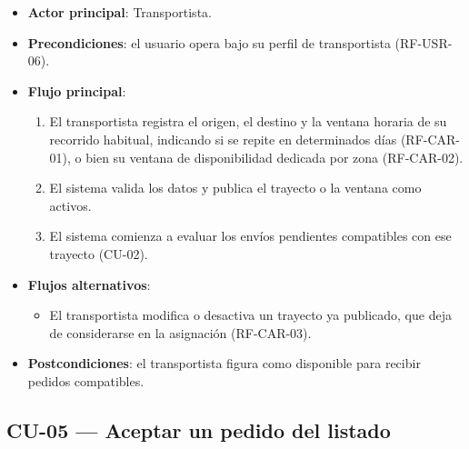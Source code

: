 {\begin{itemize}[leftmargin=2em]
    \item \textbf{Actor principal}: Transportista.
    \item \textbf{Precondiciones}: el usuario opera bajo su perfil de transportista (RF-USR-06).
    \item \textbf{Flujo principal}:
    \begin{enumerate}[leftmargin=2em]
        \item El transportista registra el origen, el destino y la ventana horaria de su recorrido habitual, indicando si se repite en determinados días (RF-CAR-01), o bien su ventana de disponibilidad dedicada por zona (RF-CAR-02).
        \item El sistema valida los datos y publica el trayecto o la ventana como activos.
        \item El sistema comienza a evaluar los envíos pendientes compatibles con ese trayecto (CU-02).
    \end{enumerate}
    \item \textbf{Flujos alternativos}:
    \begin{itemize}[leftmargin=2em]
        \item[1a.] El transportista modifica o desactiva un trayecto ya publicado, que deja de considerarse en la asignación (RF-CAR-03).
    \end{itemize}
    \item \textbf{Postcondiciones}: el transportista figura como disponible para recibir pedidos compatibles.
\end{itemize}

\subsection{CU-05 --- Aceptar un pedido del listado}

}
